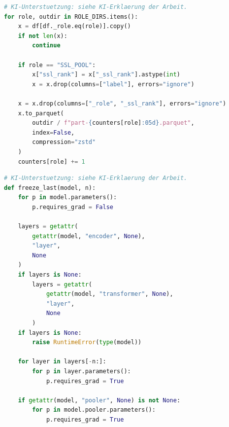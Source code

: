 \par\medskip\noindent\begin{minipage}{\dimexpr\linewidth-1em\relax}
\begin{lstlisting}[language=Python,caption={Physische Entfernung der Klassenlabels aus dem SSL-Pool},label={lst:remove_label}]
# KI-Unterstuetzung: siehe KI-Erklaerung der Arbeit.
for role, outdir in ROLE_DIRS.items():
    x = df[df._role.eq(role)].copy()
    if not len(x):
        continue

    if role == "SSL_POOL":
        x["ssl_rank"] = x["_ssl_rank"].astype(int)
        x = x.drop(columns=["label"], errors="ignore")

    x = x.drop(columns=["_role", "_ssl_rank"], errors="ignore")
    x.to_parquet(
        outdir / f"part-{counters[role]:05d}.parquet",
        index=False,
        compression="zstd"
    )
    counters[role] += 1
\end{lstlisting}
\end{minipage}\par\medskip

\par\medskip\noindent\begin{minipage}{\dimexpr\linewidth-1em\relax}
\begin{lstlisting}[language=Python,caption={Partielle Freigabe der Transformerencoder},label={lst:freeze_last}]
# KI-Unterstuetzung: siehe KI-Erklaerung der Arbeit.
def freeze_last(model, n):
    for p in model.parameters():
        p.requires_grad = False

    layers = getattr(
        getattr(model, "encoder", None),
        "layer",
        None
    )
    if layers is None:
        layers = getattr(
            getattr(model, "transformer", None),
            "layer",
            None
        )
    if layers is None:
        raise RuntimeError(type(model))

    for layer in layers[-n:]:
        for p in layer.parameters():
            p.requires_grad = True

    if getattr(model, "pooler", None) is not None:
        for p in model.pooler.parameters():
            p.requires_grad = True
\end{lstlisting}
\end{minipage}\par\medskip

